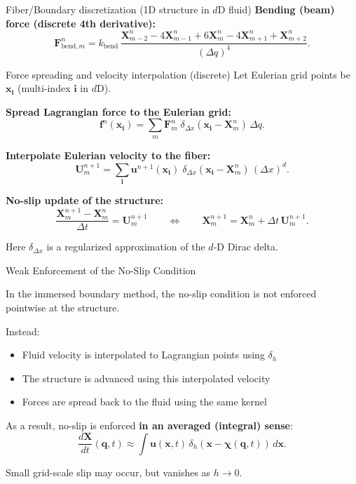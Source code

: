 \documentclass{beamer}
\begin{document}
\begin{frame}{Fiber/Boundary discretization (1D structure in $d$D fluid)}
\textbf{Bending (beam) force (discrete 4th derivative):}
\[
\mathbf{F}^{n}_{\text{bend},m}
=
k_{\text{bend}}\,
\frac{\mathbf{X}^{n}_{m-2}-4\mathbf{X}^{n}_{m-1}+6\mathbf{X}^{n}_{m}-4\mathbf{X}^{n}_{m+1}+\mathbf{X}^{n}_{m+2}}{(\Delta q)^4}.
\]
    
\end{frame}
\begin{frame}{Force spreading and velocity interpolation (discrete)}
\small
Let Eulerian grid points be $\mathbf{x}_{\mathbf{i}}$ (multi-index $\mathbf{i}$ in $d$D).

\medskip
\textbf{Spread Lagrangian force to the Eulerian grid:}
\[
\mathbf{f}^{n}(\mathbf{x}_{\mathbf{i}})
=
\sum_{m}\mathbf{F}^{n}_{m}\;
\delta_{\Delta x}\!\left(\mathbf{x}_{\mathbf{i}}-\mathbf{X}^{n}_{m}\right)\,\Delta q.
\]

\textbf{Interpolate Eulerian velocity to the fiber:}
\[
\mathbf{U}^{n+1}_{m}
=
\sum_{\mathbf{i}}\mathbf{u}^{n+1}(\mathbf{x}_{\mathbf{i}})\;
\delta_{\Delta x}\!\left(\mathbf{x}_{\mathbf{i}}-\mathbf{X}^{n}_{m}\right)\,(\Delta x)^{d}.
\]

\textbf{No-slip update of the structure:}
\[
\frac{\mathbf{X}^{n+1}_{m}-\mathbf{X}^{n}_{m}}{\Delta t}
=
\mathbf{U}^{n+1}_{m}
\qquad\Longleftrightarrow\qquad
\mathbf{X}^{n+1}_{m}=\mathbf{X}^{n}_{m}+\Delta t\,\mathbf{U}^{n+1}_{m}.
\]

\medskip
Here $\delta_{\Delta x}$ is a regularized approximation of the $d$-D Dirac delta.
\end{frame}

\begin{frame}{Weak Enforcement of the No-Slip Condition}
\small

In the immersed boundary method, the no-slip condition is not enforced
pointwise at the structure.

\medskip
Instead:
\begin{itemize}
    \item Fluid velocity is interpolated to Lagrangian points using $\delta_h$
    \item The structure is advanced using this interpolated velocity
    \item Forces are spread back to the fluid using the same kernel
\end{itemize}

\medskip
As a result, no-slip is enforced \textbf{in an averaged (integral) sense}:
\[
\frac{d\mathbf{X}}{dt}(\mathbf{q},t)
\approx
\int \mathbf{u}(\mathbf{x},t)\,
\delta_h(\mathbf{x}-\boldsymbol{\chi}(\mathbf{q},t))\,d\mathbf{x}.
\]

\medskip
Small grid-scale slip may occur, but vanishes as $h \to 0$.

\end{frame}
\end{document}

